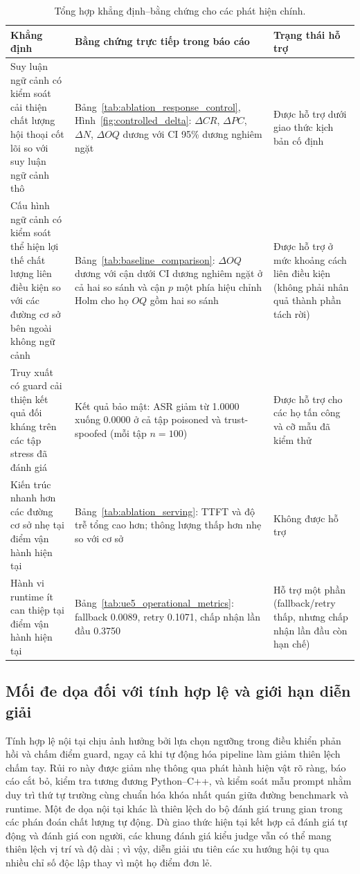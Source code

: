 ﻿\documentclass[a4paper,12pt]{article}
\begin{document}
\begin{table}[t]
\centering
\caption{Tổng hợp khẳng định--bằng chứng cho các phát hiện chính.}
\label{tab:claim_evidence_map}
\begingroup
\footnotesize
\setlength{\tabcolsep}{4pt}
\begin{tabular}{p{}p{}p{}}
\toprule
Khẳng định & Bằng chứng trực tiếp trong báo cáo & Trạng thái hỗ trợ \\
\midrule
Suy luận ngữ cảnh có kiểm soát cải thiện chất lượng hội thoại cốt lõi so với suy luận ngữ cảnh thô & Bảng~\ref{tab:ablation_response_control}, Hình~\ref{fig:controlled_delta}: \(\Delta CR\), \(\Delta PC\), \(\Delta N\), \(\Delta OQ\) dương với CI 95\% dương nghiêm ngặt & Được hỗ trợ dưới giao thức kịch bản cố định \\
Cấu hình ngữ cảnh có kiểm soát thể hiện lợi thế chất lượng liên điều kiện so với các đường cơ sở bên ngoài không ngữ cảnh & Bảng~\ref{tab:baseline_comparison}: \(\Delta OQ\) dương với cận dưới CI dương nghiêm ngặt ở cả hai so sánh và cận \(p\) một phía hiệu chỉnh Holm cho họ \(OQ\) gồm hai so sánh & Được hỗ trợ ở mức khoảng cách liên điều kiện (không phải nhân quả thành phần tách rời) \\
Truy xuất có guard cải thiện kết quả đối kháng trên các tập stress đã đánh giá & Kết quả bảo mật: ASR giảm từ 1.0000 xuống 0.0000 ở cả tập poisoned và trust-spoofed (mỗi tập \(n=100\)) & Được hỗ trợ cho các họ tấn công và cỡ mẫu đã kiểm thử \\
Kiến trúc nhanh hơn các đường cơ sở nhẹ tại điểm vận hành hiện tại & Bảng~\ref{tab:ablation_serving}: TTFT và độ trễ tổng cao hơn; thông lượng thấp hơn nhẹ so với cơ sở & Không được hỗ trợ \\
Hành vi runtime ít can thiệp tại điểm vận hành hiện tại & Bảng~\ref{tab:ue5_operational_metrics}: fallback 0.0089, retry 0.1071, chấp nhận lần đầu 0.3750 & Hỗ trợ một phần (fallback/retry thấp, nhưng chấp nhận lần đầu còn hạn chế) \\
\bottomrule
\end{tabular}
\endgroup
\end{table}

\subsection{Mối đe dọa đối với tính hợp lệ và giới hạn diễn giải}
Tính hợp lệ nội tại chịu ảnh hưởng bởi lựa chọn ngưỡng trong điều khiển phản hồi và chấm điểm guard, ngay cả khi tự động hóa pipeline làm giảm thiên lệch chấm tay. Rủi ro này được giảm nhẹ thông qua phát hành hiện vật rõ ràng, báo cáo cắt bỏ, kiểm tra tương đương Python--C++, và kiểm soát mẫu prompt nhằm duy trì thứ tự trường cùng chuẩn hóa khóa nhất quán giữa đường benchmark và runtime. Một đe dọa nội tại khác là thiên lệch do bộ đánh giá trung gian trong các phán đoán chất lượng tự động. Dù giao thức hiện tại kết hợp cả đánh giá tự động và đánh giá con người, các khung đánh giá kiểu judge vẫn có thể mang thiên lệch vị trí và độ dài \cite{Zheng2023MTBench,Wang2024Judge,Dubois2024AlpacaEval}; vì vậy, diễn giải ưu tiên các xu hướng hội tụ qua nhiều chỉ số độc lập thay vì một họ điểm đơn lẻ.
\end{document}
